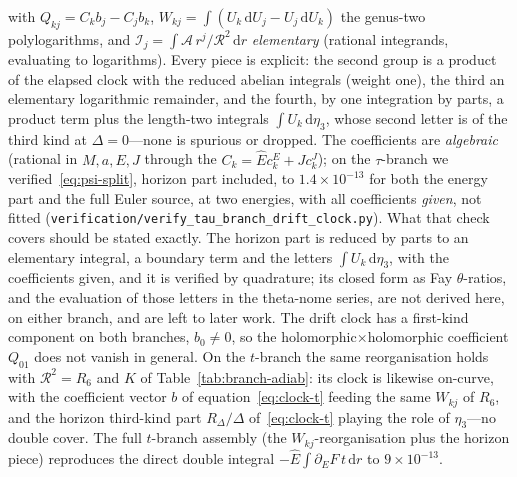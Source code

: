 \documentclass[12pt]{iopart}
\theoremstyle{plain}
\theoremstyle{definition}
\theoremstyle{remark}
\newcommand{\Ehat}{\hat E}
\newcommand{\dd}{\mathrm{d}}
\begin{document}
with $Q_{kj}=C_k b_j-C_j b_k$, $W_{kj}=\int(U_k\,\dd U_j-U_j\,\dd U_k)$ the
genus-two polylogarithms, and $\mathcal{I}_j=\int\mathcal{A}\,r^j/\mathcal{R}^2\,
\dd r$ \emph{elementary} (rational integrands, evaluating to logarithms). Every
piece is explicit: the second group is a product of the elapsed clock with the
reduced abelian integrals (weight one), the third an elementary logarithmic
remainder, and the fourth, by one integration by parts, a product term plus the
length-two integrals $\int U_k\,\dd\eta_3$, whose second letter is of the third
kind at $\Delta=0$---none is spurious or dropped. The coefficients are \emph{algebraic}
(rational in $M,a,E,J$ through the $C_k=\Ehat c_k^E+J c_k^J$); on the
$\tau$-branch we verified~\eqref{eq:psi-split}, horizon part included, to
$1.4\times10^{-13}$ for both the energy part and the full Euler source, at two
energies, with all coefficients \emph{given}, not fitted
(\texttt{verification/verify\_tau\_branch\_drift\_clock.py}). What that check
covers should be stated exactly. The horizon part is reduced by parts to an
elementary integral, a boundary term and the letters $\int U_k\,\dd\eta_3$, with
the coefficients given, and it is verified by quadrature; its closed form as
Fay $\theta$-ratios, and the evaluation of those letters in the theta-nome series,
are not derived here, on either branch, and are left to later work. The drift clock has a
first-kind component on both branches, $b_0\neq0$, so the
holomorphic$\times$holomorphic coefficient $Q_{01}$ does not vanish in general. On
the $t$-branch the same reorganisation holds with $\mathcal{R}^2=R_6$ and $K$ of
Table~\ref{tab:branch-adiab}: its clock is likewise on-curve, with the coefficient
vector $b$ of equation~\eqref{eq:clock-t} feeding the same $W_{kj}$ of $R_6$, and
the horizon third-kind part $R_\Delta/\Delta$ of~\eqref{eq:clock-t} playing the
role of $\eta_3$---no double cover. The full $t$-branch assembly (the
$W_{kj}$-reorganisation plus the horizon piece) reproduces the direct double integral
$-\Ehat\!\int\!\partial_E F\,t\,\dd r$ to $9\times10^{-13}$.
\end{document}
